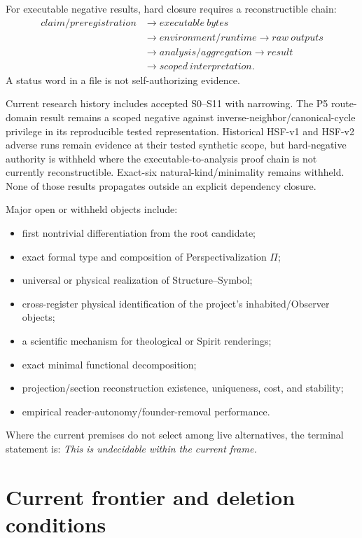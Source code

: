 \documentclass[11pt]{article}
\begin{document}
For executable negative results, hard closure requires a reconstructible chain:
\begin{equation}
\begin{aligned}
claim/preregistration
&\rightarrow executable\ bytes\\
&\rightarrow environment/runtime
\rightarrow raw\ outputs\\
&\rightarrow analysis/aggregation
\rightarrow result\\
&\rightarrow scoped\ interpretation.
\end{aligned}
\end{equation}
A status word in a file is not self-authorizing evidence.

Current research history includes accepted S0--S11 with narrowing. The P5 route-domain result remains a scoped negative against inverse-neighbor/canonical-cycle privilege in its reproducible tested representation. Historical HSF-v1 and HSF-v2 adverse runs remain evidence at their tested synthetic scope, but hard-negative authority is withheld where the executable-to-analysis proof chain is not currently reconstructible. Exact-six natural-kind/minimality remains withheld. None of those results propagates outside an explicit dependency closure.

Major open or withheld objects include:
\begin{itemize}
\item first nontrivial differentiation from the root candidate;
\item exact formal type and composition of Perspectivalization $\Pi$;
\item universal or physical realization of Structure--Symbol;
\item cross-register physical identification of the project's inhabited/Observer objects;
\item a scientific mechanism for theological or Spirit renderings;
\item exact minimal functional decomposition;
\item projection/section reconstruction existence, uniqueness, cost, and stability;
\item empirical reader-autonomy/founder-removal performance.
\end{itemize}

Where the current premises do not select among live alternatives, the terminal statement is: \emph{This is undecidable within the current frame.}

\section{Current frontier and deletion conditions}
\end{document}
